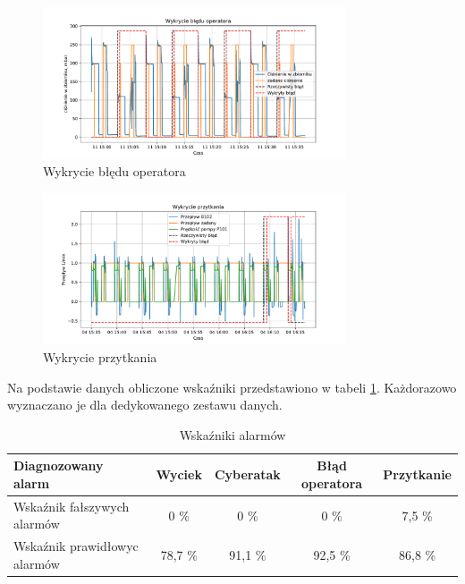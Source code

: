 \documentclass[a4paper,12pt]{article}
\begin{document}
\begin{figure}[H]
        \centering
        \includegraphics[width=0.8\textwidth]{error_detection_wskazniki.pdf}
        \caption{Wykrycie błędu operatora}
        \label{fig:error5}
\end{figure}

\begin{figure}[H]
        \centering
        \includegraphics[width=0.8\textwidth]{clogging_detection_wskazniki.pdf}
        \caption{Wykrycie przytkania}
        \label{fig:zatkanie5}
\end{figure}

Na podstawie danych obliczone wskaźniki przedstawiono w tabeli \ref{tab:wskaźniki}. Każdorazowo wyznaczano je dla dedykowanego zestawu danych.

\begin{table}[H]
\centering
\caption{Wskaźniki alarmów}
\begin{tabular}{lcccc}
\toprule
Diagnozowany alarm & \textbf{Wyciek} & \textbf{Cyberatak} & \textbf{Błąd operatora} & \textbf{Przytkanie}\\
\midrule
Wskaźnik fałszywych alarmów & 0 \% & 0 \% & 0 \% & 7,5 \% \\
Wskaźnik prawidłowyc alarmów & 78,7 \% & 91,1 \% & 92,5 \% & 86,8 \% \\
\bottomrule
\end{tabular}
\label{tab:wskaźniki}
\end{table}
\end{document}
